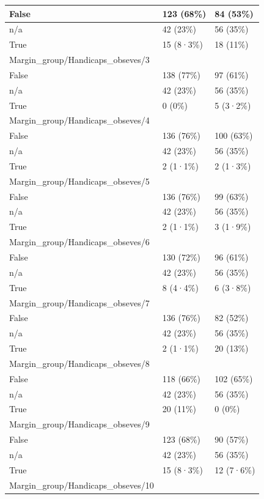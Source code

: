 \documentclass[
]{book}
\begin{document}
\begin{tabular}{l|l|l}
\hline
False & 123 (68\%) & 84 (53\%)\\
\hline
n/a & 42 (23\%) & 56 (35\%)\\
\hline
True & 15 (8·3\%) & 18 (11\%)\\
\hline
Margin\_group/Handicaps\_obseves/3 &  & \\
\hline
False & 138 (77\%) & 97 (61\%)\\
\hline
n/a & 42 (23\%) & 56 (35\%)\\
\hline
True & 0 (0\%) & 5 (3·2\%)\\
\hline
Margin\_group/Handicaps\_obseves/4 &  & \\
\hline
False & 136 (76\%) & 100 (63\%)\\
\hline
n/a & 42 (23\%) & 56 (35\%)\\
\hline
True & 2 (1·1\%) & 2 (1·3\%)\\
\hline
Margin\_group/Handicaps\_obseves/5 &  & \\
\hline
False & 136 (76\%) & 99 (63\%)\\
\hline
n/a & 42 (23\%) & 56 (35\%)\\
\hline
True & 2 (1·1\%) & 3 (1·9\%)\\
\hline
Margin\_group/Handicaps\_obseves/6 &  & \\
\hline
False & 130 (72\%) & 96 (61\%)\\
\hline
n/a & 42 (23\%) & 56 (35\%)\\
\hline
True & 8 (4·4\%) & 6 (3·8\%)\\
\hline
Margin\_group/Handicaps\_obseves/7 &  & \\
\hline
False & 136 (76\%) & 82 (52\%)\\
\hline
n/a & 42 (23\%) & 56 (35\%)\\
\hline
True & 2 (1·1\%) & 20 (13\%)\\
\hline
Margin\_group/Handicaps\_obseves/8 &  & \\
\hline
False & 118 (66\%) & 102 (65\%)\\
\hline
n/a & 42 (23\%) & 56 (35\%)\\
\hline
True & 20 (11\%) & 0 (0\%)\\
\hline
Margin\_group/Handicaps\_obseves/9 &  & \\
\hline
False & 123 (68\%) & 90 (57\%)\\
\hline
n/a & 42 (23\%) & 56 (35\%)\\
\hline
True & 15 (8·3\%) & 12 (7·6\%)\\
\hline
Margin\_group/Handicaps\_obseves/10 &  & \\

\end{tabular}
\end{document}
